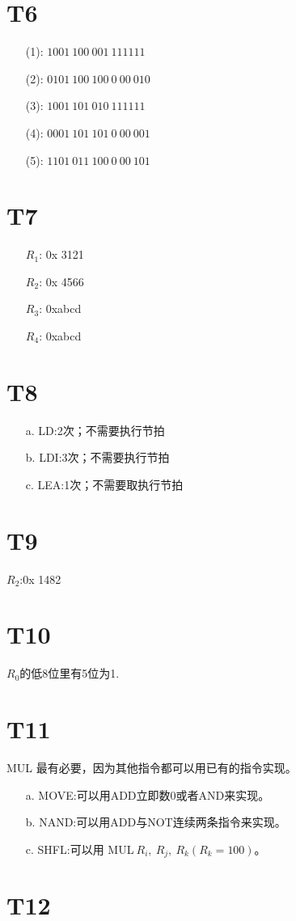 \documentclass{article}
\begin{document}
\section*{T6}
\begin{enumerate}
    \item [(1):]$1001\ 100\ 001\ 111 111$
    \item [(2):]$0101\ 100\ 100\ 0\ 00\ 010$
    \item [(3):]$1001\ 101\ 010\ 111 111$
    \item [(4):]$0001\ 101\ 101\ 0\ 00\ 001$
    \item [(5):]$1101\ 011\ 100\ 0\ 00\ 101$
\end{enumerate}

\section*{T7}
\begin{enumerate}
    \item [$R_1$:]0x 3121
    \item [$R_2$:]0x 4566
    \item [$R_3$:]0xabcd
    \item [$R_4$:]0xabcd
\end{enumerate}

\section*{T8}
    \begin{enumerate}
        \item [a.]LD:2次；不需要执行节拍
        \item [b.]LDI:3次；不需要执行节拍
        \item [c.]LEA:1次；不需要取执行节拍
    \end{enumerate}

\section*{T9}
    $R_2$:0x 1482

\section*{T10}
    $R_0$的低8位里有5位为1.

\section*{T11}
    MUL 最有必要，因为其他指令都可以用已有的指令实现。
    \begin{enumerate}
        \item [a.]MOVE:可以用ADD立即数0或者AND来实现。
        \item [b.]NAND:可以用ADD与NOT连续两条指令来实现。
        \item [c.]SHFL:可以用 MUL$\ R_i,\ R_j,\ R_k (R_k=100)$。
    \end{enumerate}

\section*{T12}
\end{document}
